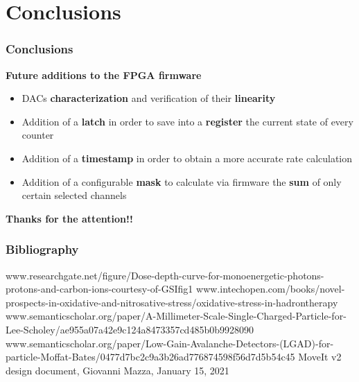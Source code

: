 \documentclass[aspectratio=169]{beamer}
\begin{document}
	\section{Conclusions}
	
	\begin{frame}
	\frametitle{Conclusions }
	\begin{center}
		{\color{blue}\textbf{Future additions to the FPGA firmware}}
	\end{center}
		\begin{itemize}
			\item DACs \textbf{characterization} and verification of their \textbf{linearity}
			\item Addition of a \textbf{latch} in order to save into a \textbf{register} the current state of every counter 
			\item Addition of a \textbf{timestamp} in order to obtain a more accurate rate calculation 
			\item Addition of a configurable \textbf{mask} to calculate via firmware the \textbf{sum} of only certain selected channels 		
		\end{itemize}
			\vspace{1 cm}
		\begin{center}
			\textbf{Thanks for the attention!!}
		\end{center}	
	\end{frame}

	\begin{frame}[noframenumbering]
	\frametitle{Bibliography}
	{\scriptsize 
	\begin{thebibliography}{00}
		www.researchgate.net/figure/Dose-depth-curve-for-monoenergetic-photons-protons-and-carbon-ions-courtesy-of-GSI\textunderscore fig1\textunderscore283521369
		\newline
		www.intechopen.com/books/novel-prospects-in-oxidative-and-nitrosative-stress/oxidative-stress-in-hadrontherapy
		\newline
		www.semanticscholar.org/paper/A-Millimeter-Scale-Single-Charged-Particle-for-Lee-Scholey/ae955a07a42e9c124a8473357cd485b0b9928090
		\newline
		www.semanticscholar.org/paper/Low-Gain-Avalanche-Detectors-(LGAD)-for-particle-Moffat-Bates/0477d7bc2c9a3b26ad776874598f56d7d5b54c45
		\newline
		MoveIt v2 design document, Giovanni Mazza, January 15, 2021
	\end{thebibliography} }
	\end{frame}
\end{document}
